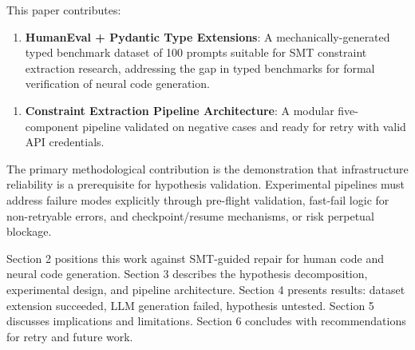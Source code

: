 This paper contributes:

\begin{enumerate}
\item \textbf{HumanEval + Pydantic Type Extensions}: A mechanically-generated typed benchmark dataset of 100 prompts suitable for SMT constraint extraction research, addressing the gap in typed benchmarks for formal verification of neural code generation.
\end{enumerate}

\begin{enumerate}
\item \textbf{Constraint Extraction Pipeline Architecture}: A modular five-component pipeline validated on negative cases and ready for retry with valid API credentials.
\end{enumerate}

The primary methodological contribution is the demonstration that infrastructure reliability is a prerequisite for hypothesis validation. Experimental pipelines must address failure modes explicitly through pre-flight validation, fast-fail logic for non-retryable errors, and checkpoint/resume mechanisms, or risk perpetual blockage.

Section 2 positions this work against SMT-guided repair for human code and neural code generation. Section 3 describes the hypothesis decomposition, experimental design, and pipeline architecture. Section 4 presents results: dataset extension succeeded, LLM generation failed, hypothesis untested. Section 5 discusses implications and limitations. Section 6 concludes with recommendations for retry and future work.
